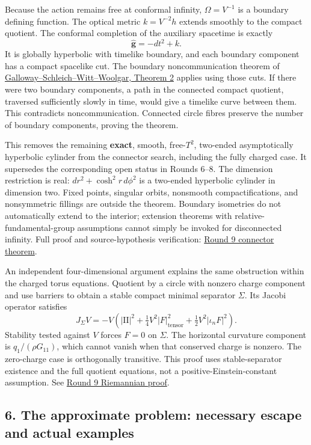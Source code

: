 \documentclass[
  english,
]{article}
\begin{document}
Because the action remains free at conformal infinity, \(\Omega=V^{-1}\)
is a boundary defining function. The optical metric \(k=V^{-2}h\)
extends smoothly to the compact quotient. The conformal completion of
the auxiliary spacetime is exactly \[
 \widehat{\mathbf g}=-dt^2+k.
\] It is globally hyperbolic with timelike boundary, and each boundary
component has a compact spacelike cut. The boundary noncommunication
theorem of
\href{https://arxiv.org/pdf/hep-th/9912119}{Galloway--Schleich--Witt--Woolgar,
Theorem 2} applies using those cuts. If there were two boundary
components, a path in the connected compact quotient, traversed
sufficiently slowly in time, would give a timelike curve between them.
This contradicts noncommunication. Connected circle fibres preserve the
number of boundary components, proving the theorem.

This removes the remaining \textbf{exact}, smooth, free-\(T^2\),
two-ended asymptotically hyperbolic cylinder from the connector search,
including the fully charged case. It supersedes the corresponding open
status in Rounds 6--8. The dimension restriction is real:
\(dr^2+\cosh^2r\,d\phi^2\) is a two-ended hyperbolic cylinder in
dimension two. Fixed points, singular orbits, nonsmooth
compactifications, and nonsymmetric fillings are outside the theorem.
Boundary isometries do not automatically extend to the interior;
extension theorems with relative-fundamental-group assumptions cannot
simply be invoked for disconnected infinity. Full proof and
source-hypothesis verification:
\href{../proofs/round9_connector.md}{Round 9 connector theorem}.

An independent four-dimensional argument explains the same obstruction
within the charged torus equations. Quotient by a circle with nonzero
charge component and use barriers to obtain a stable compact minimal
separator \(\Sigma\). Its Jacobi operator satisfies \[
 J_\Sigma V=-V\left(
 |\mathrm{II}|^2+\tfrac14V^2|F|_{\mathrm{tensor}}^2
                     +\tfrac12V^2|\iota_nF|^2\right).
\] Stability tested against \(V\) forces \(F=0\) on \(\Sigma\). The
horizontal curvature component is \(q_1/(\rho G_{11})\), which cannot
vanish when that conserved charge is nonzero. The zero-charge case is
orthogonally transitive. This proof uses stable-separator existence and
the full quotient equations, not a positive-Einstein-constant
assumption. See \href{../proofs/round9_riemannian.md}{Round 9 Riemannian
proof}.

\hypertarget{the-approximate-problem-necessary-escape-and-actual-examples}{%
\subsection{6. The approximate problem: necessary escape and actual
examples}\label{the-approximate-problem-necessary-escape-and-actual-examples}}
\end{document}
